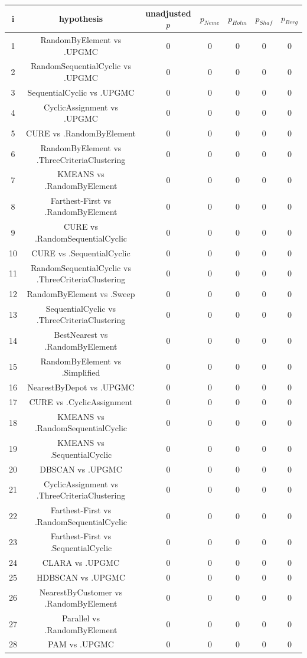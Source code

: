 \documentclass[a4paper,10pt]{article}
\begin{document}
\begin{landscape}
\begin{table}[!htp]
\centering\scriptsize
\begin{tabular}{ccccccc}
i&hypothesis&unadjusted $p$&$p_{Neme}$&$p_{Holm}$&$p_{Shaf}$&$p_{Berg}$\\
\hline1&RandomByElement vs .UPGMC&0&0&0&0&0\\
2&RandomSequentialCyclic vs .UPGMC&0&0&0&0&0\\
3&SequentialCyclic vs .UPGMC&0&0&0&0&0\\
4&CyclicAssignment vs .UPGMC&0&0&0&0&0\\
5&CURE vs .RandomByElement&0&0&0&0&0\\
6&RandomByElement vs .ThreeCriteriaClustering&0&0&0&0&0\\
7&KMEANS vs .RandomByElement&0&0&0&0&0\\
8&Farthest-First vs .RandomByElement&0&0&0&0&0\\
9&CURE vs .RandomSequentialCyclic&0&0&0&0&0\\
10&CURE vs .SequentialCyclic&0&0&0&0&0\\
11&RandomSequentialCyclic vs .ThreeCriteriaClustering&0&0&0&0&0\\
12&RandomByElement vs .Sweep&0&0&0&0&0\\
13&SequentialCyclic vs .ThreeCriteriaClustering&0&0&0&0&0\\
14&BestNearest vs .RandomByElement&0&0&0&0&0\\
15&RandomByElement vs .Simplified&0&0&0&0&0\\
16&NearestByDepot vs .UPGMC&0&0&0&0&0\\
17&CURE vs .CyclicAssignment&0&0&0&0&0\\
18&KMEANS vs .RandomSequentialCyclic&0&0&0&0&0\\
19&KMEANS vs .SequentialCyclic&0&0&0&0&0\\
20&DBSCAN vs .UPGMC&0&0&0&0&0\\
21&CyclicAssignment vs .ThreeCriteriaClustering&0&0&0&0&0\\
22&Farthest-First vs .RandomSequentialCyclic&0&0&0&0&0\\
23&Farthest-First vs .SequentialCyclic&0&0&0&0&0\\
24&CLARA vs .UPGMC&0&0&0&0&0\\
25&HDBSCAN vs .UPGMC&0&0&0&0&0\\
26&NearestByCustomer vs .RandomByElement&0&0&0&0&0\\
27&Parallel vs .RandomByElement&0&0&0&0&0\\
28&PAM vs .UPGMC&0&0&0&0&0\\

\end{tabular}
\end{table}
\end{landscape}
\end{document}
